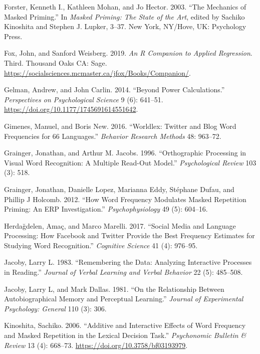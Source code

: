 \documentclass[
]{interact}
\newlength{\cslhangindent}
\newenvironment{CSLReferences}[2] %
 {\begin{list}{}{%
  \setlength{\itemindent}{0pt}
  \setlength{\leftmargin}{0pt}
  \setlength{\parsep}{0pt}
  \ifodd #1
   \setlength{\leftmargin}{\cslhangindent}
   \setlength{\itemindent}{-1\cslhangindent}
  \fi
  \setlength{\itemsep}{#2\baselineskip}}}
 {\end{list}}
\begin{document}
\begin{CSLReferences}{1}{0}
Forster, Kenneth I., Kathleen Mohan, and Jo Hector. 2003. {``The
Mechanics of Masked Priming.''} In \emph{Masked Priming: The State of
the Art}, edited by Sachiko Kinoshita and Stephen J. Lupker, 3--37. New
York, NY/Hove, UK: Psychology Press.

Fox, John, and Sanford Weisberg. 2019. \emph{An {R} Companion to Applied
Regression}. Third. Thousand Oaks {CA}: Sage.
\url{https://socialsciences.mcmaster.ca/jfox/Books/Companion/}.

Gelman, Andrew, and John Carlin. 2014. {``Beyond Power Calculations.''}
\emph{Perspectives on Psychological Science} 9 (6): 641--51.
\url{https://doi.org/10.1177/1745691614551642}.

Gimenes, Manuel, and Boris New. 2016. {``Worldlex: Twitter and Blog Word
Frequencies for 66 Languages.''} \emph{Behavior Research Methods} 48:
963--72.

Grainger, Jonathan, and Arthur M. Jacobs. 1996. {``Orthographic
Processing in Visual Word Recognition: A Multiple Read-Out Model.''}
\emph{Psychological Review} 103 (3): 518.

Grainger, Jonathan, Danielle Lopez, Marianna Eddy, Stéphane Dufau, and
Phillip J Holcomb. 2012. {``How Word Frequency Modulates Masked
Repetition Priming: An ERP Investigation.''} \emph{Psychophysiology} 49
(5): 604--16.

Herdağdelen, Amaç, and Marco Marelli. 2017. {``Social Media and Language
Processing: How Facebook and Twitter Provide the Best Frequency
Estimates for Studying Word Recognition.''} \emph{Cognitive Science} 41
(4): 976--95.

Jacoby, Larry L. 1983. {``Remembering the Data: Analyzing Interactive
Processes in Reading.''} \emph{Journal of Verbal Learning and Verbal
Behavior} 22 (5): 485--508.

Jacoby, Larry L, and Mark Dallas. 1981. {``On the Relationship Between
Autobiographical Memory and Perceptual Learning.''} \emph{Journal of
Experimental Psychology: General} 110 (3): 306.

Kinoshita, Sachiko. 2006. {``Additive and Interactive Effects of Word
Frequency and Masked Repetition in the Lexical Decision Task.''}
\emph{Psychonomic Bulletin \& Review} 13 (4): 668--73.
\url{https://doi.org/10.3758/bf03193979}.


\end{CSLReferences}
\end{document}
